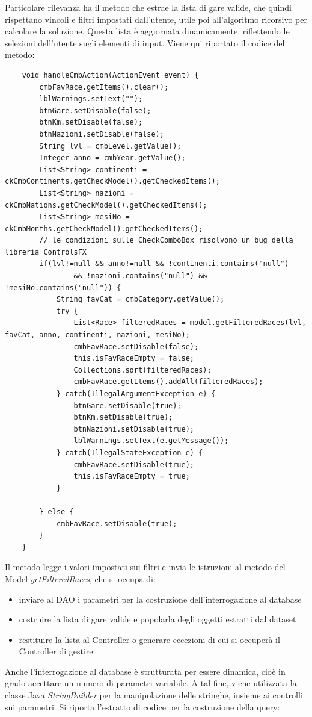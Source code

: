 \documentclass[a4paper, 12pt, oneside]{book}
\begin{document}
Particolare rilevanza ha il metodo che estrae la lista di gare valide, che quindi rispettano vincoli e filtri impostati dall'utente, utile poi all'algoritmo ricorsivo per calcolare la soluzione. Questa lista è aggiornata dinamicamente, riflettendo le selezioni dell'utente sugli elementi di input. Viene qui riportato il codice del metodo:
\begin{lstlisting}
    void handleCmbAction(ActionEvent event) {
    	cmbFavRace.getItems().clear();
    	lblWarnings.setText("");
    	btnGare.setDisable(false);
		btnKm.setDisable(false);
		btnNazioni.setDisable(false);
    	String lvl = cmbLevel.getValue();
    	Integer anno = cmbYear.getValue(); 
    	List<String> continenti = ckCmbContinents.getCheckModel().getCheckedItems();
    	List<String> nazioni = ckCmbNations.getCheckModel().getCheckedItems();
    	List<String> mesiNo = ckCmbMonths.getCheckModel().getCheckedItems();
    	// le condizioni sulle CheckComboBox risolvono un bug della libreria ControlsFX
    	if(lvl!=null && anno!=null && !continenti.contains("null") 
    			&& !nazioni.contains("null") && !mesiNo.contains("null")) {
    		String favCat = cmbCategory.getValue();
    		try {
    			List<Race> filteredRaces = model.getFilteredRaces(lvl, favCat, anno, continenti, nazioni, mesiNo);
    			cmbFavRace.setDisable(false);
    			this.isFavRaceEmpty = false;
    			Collections.sort(filteredRaces);
    			cmbFavRace.getItems().addAll(filteredRaces);
    		} catch(IllegalArgumentException e) {
    			btnGare.setDisable(true);
    			btnKm.setDisable(true);
    			btnNazioni.setDisable(true);
    			lblWarnings.setText(e.getMessage());
    		} catch(IllegalStateException e) {
    			cmbFavRace.setDisable(true);
    			this.isFavRaceEmpty = true;
    		}
    		
    	} else {
    		cmbFavRace.setDisable(true);
    	}
    }
\end{lstlisting}
Il metodo legge i valori impostati sui filtri e invia le istruzioni al metodo del Model \textit{getFilteredRaces}, che si occupa di:
\begin{itemize}
    \item inviare al DAO i parametri per la costruzione dell'interrogazione al database
    \item costruire la lista di gare valide e popolarla degli oggetti estratti dal dataset
    \item restituire la lista al Controller o generare eccezioni di cui si occuperà il Controller di gestire 
\end{itemize}
Anche l'interrogazione al database è strutturata per essere dinamica, cioè in grado accettare un numero di parametri variabile. A tal fine, viene utilizzata la classe Java \textit{StringBuilder} per la manipolazione delle stringhe, insieme ai controlli sui parametri. Si riporta l'estratto di codice per la costruzione della query:
\end{document}

